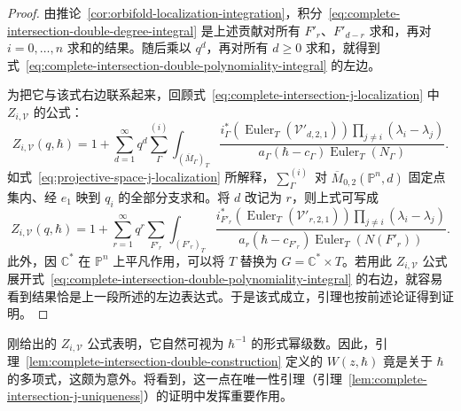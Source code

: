 \begin{proof}
由推论~\ref{cor:orbifold-localization-integration}，积分~\eqref{eq:complete-intersection-double-degree-integral} 是上述贡献对所有 $F'_r$、$F'_{d-r}$ 求和，再对 $i=0,\ldots,n$ 求和的结果。随后乘以 $q^d$，再对所有 $d\ge0$ 求和，就得到式~\eqref{eq:complete-intersection-double-polynomiality-integral} 的左边。

为把它与该式右边联系起来，回顾式~\eqref{eq:complete-intersection-j-localization} 中 $Z_{i,\mathcal V}$ 的公式：
\[
Z_{i,\mathcal V}(q,\hbar)=1+\sum_{d=1}^{\infty}q^d\sum_\Gamma^{(i)}
\int_{(\overline M_\Gamma)_T}\frac{i_\Gamma^*(\operatorname{Euler}_T(\mathcal V'_{d,2,1}))\prod_{j\ne i}(\lambda_i-\lambda_j)}{a_\Gamma(\hbar-c_\Gamma)\operatorname{Euler}_T(N_\Gamma)}.
\]
如式~\eqref{eq:projective-space-j-localization} 所解释，$\sum_\Gamma^{(i)}$ 对 $\overline M_{0,2}(\mathbb P^n,d)$ 固定点集内、经 $e_1$ 映到 $q_i$ 的全部分支求和。将 $d$ 改记为 $r$，则上式可写成
\[
Z_{i,\mathcal V}(q,\hbar)=1+\sum_{r=1}^{\infty}q^r\sum_{F'_r}
\int_{(F'_r)_T}\frac{i_{F'_r}^*(\operatorname{Euler}_T(\mathcal V'_{r,2,1}))\prod_{j\ne i}(\lambda_i-\lambda_j)}{a_r(\hbar-c_{F'_r})\operatorname{Euler}_T(N(F'_r))}.
\]
此外，因 $\mathbb C^*$ 在 $\mathbb P^n$ 上平凡作用，可以将 $T$ 替换为 $G=\mathbb C^*\times T$。若用此 $Z_{i,\mathcal V}$ 公式展开式~\eqref{eq:complete-intersection-double-polynomiality-integral} 的右边，就容易看到结果恰是上一段所述的左边表达式。于是该式成立，引理也按前述论证得到证明。
\end{proof}
刚给出的 $Z_{i,\mathcal V}$ 公式表明，它自然可视为 $\hbar^{-1}$ 的形式幂级数。因此，引理~\ref{lem:complete-intersection-double-construction} 定义的 $W(z,\hbar)$ 竟是关于 $\hbar$ 的多项式，这颇为意外。将看到，这一点在唯一性引理（引理~\ref{lem:complete-intersection-j-uniqueness}）的证明中发挥重要作用。

